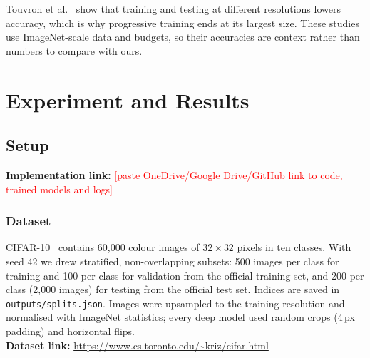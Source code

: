 \documentclass[10pt,twocolumn]{article}
\newcommand{\todo}[1]{\textcolor{red}{#1}}
\begin{document}
Touvron et al.~\cite{touvron2019fixing} show that training and testing at different resolutions lowers
accuracy, which is why progressive training ends at its largest size. These studies use ImageNet-scale
data and budgets, so their accuracies are context rather than numbers to compare with ours.

\section{Experiment and Results}
\subsection{Setup}
\textbf{Implementation link:} \todo{[paste OneDrive/Google Drive/GitHub link to code, trained models and logs]}

\subsubsection{Dataset}
CIFAR-10~\cite{krizhevsky2009learning} contains 60{,}000 colour images of $32{\times}32$ pixels in ten
classes. With seed 42 we drew stratified, non-overlapping subsets: 500 images per class for training
and 100 per class for validation from the official training set, and 200 per class (2{,}000 images)
for testing from the official test set. Indices are saved in \texttt{outputs/splits.json}. Images were
upsampled to the training resolution and normalised with ImageNet statistics; every deep model used
random crops (4\,px padding) and horizontal flips.\\
\textbf{Dataset link:} \url{https://www.cs.toronto.edu/~kriz/cifar.html}
\end{document}
